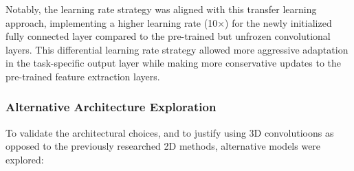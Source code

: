 \documentclass[12pt, a4paper]{article}
\begin{document}
Notably, the learning rate strategy was aligned with this transfer learning approach, implementing a higher learning rate (10×) for the newly initialized fully connected layer compared to the pre-trained but unfrozen convolutional layers. This differential learning rate strategy allowed more aggressive adaptation in the task-specific output layer while making more conservative updates to the pre-trained feature extraction layers.

\subsubsection{Alternative Architecture Exploration}

To validate the architectural choices, and to justify using 3D convolutioons as opposed to the previously researched 2D methods, alternative models were explored:
\end{document}
